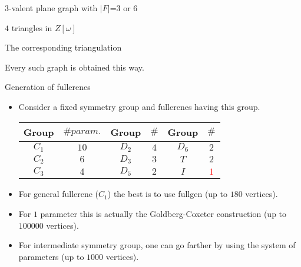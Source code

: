 \documentclass[%
pdf,
colorBG,
slideColor,
]{prosper}
\begin{document}
\begin{slide}{$3$-valent plane graph with $|F|$=$3$ or $6$}

\vspace{-4mm}
\begin{center}
\begin{minipage}{5cm}
\par
$4$ triangles in $Z[\omega]$
\end{minipage}
\begin{minipage}{5cm}
\par
The corresponding triangulation
\end{minipage}
\end{center}

\begin{center}
\begin{minipage}{5cm}
\par
\end{minipage}
\begin{minipage}{5cm}
Every such graph is obtained this way.
\end{minipage}
\end{center}

\end{slide}





\begin{slide}{Generation of fullerenes}
\begin{itemize}
\item Consider a fixed symmetry group and fullerenes having this group.
\begin{center}
\begin{tabular}{||c|c||c|c||c|c||}
\hline
\hline
Group  & $\# param.$ &
Group  & $\#$ &
Group  & $\#$\\
\hline
\hline
$C_1$  &$10$ &$D_2$  &$4$ &$D_6$  &$2$\\
$C_2$  &$6$ &$D_3$  &$3$ &$T$    &$2$\\
$C_3$  &$4$ &$D_5$  &$2$ &$I$    &\textcolor{red}{$1$}\\
\hline
\hline
\end{tabular}
\end{center}
\item For general fullerene ($C_1$) the best is to use fullgen (up to $180$ vertices).
\item For $1$ parameter this is actually the Goldberg-Coxeter construction (up to $100000$ vertices).
\item For intermediate symmetry group, one can go farther by using the system of parameters (up to $1000$ vertices).
\end{itemize}

\end{slide}
\end{document}
